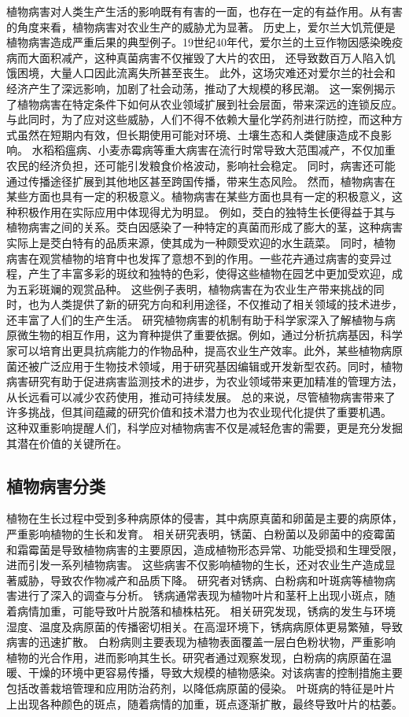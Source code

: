\documentclass[AutoFakeBold]{LZUThesis-PgD&PhD}
\begin{document}
植物病害对人类生产生活的影响既有有害的一面，也存在一定的有益作用。从有害的角度来看，植物病害对农业生产的威胁尤为显著。
历史上，爱尔兰大饥荒便是植物病害造成严重后果的典型例子。19世纪40年代，爱尔兰的土豆作物因感染晚疫病而大面积减产，这种真菌病害不仅摧毁了大片的农田，
还导致数百万人陷入饥饿困境，大量人口因此流离失所甚至丧生。
此外，这场灾难还对爱尔兰的社会和经济产生了深远影响，加剧了社会动荡，推动了大规模的移民潮。
这一案例揭示了植物病害在特定条件下如何从农业领域扩展到社会层面，带来深远的连锁反应。
与此同时，为了应对这些威胁，人们不得不依赖大量化学药剂进行防控，而这种方式虽然在短期内有效，但长期使用可能对环境、土壤生态和人类健康造成不良影响。
水稻稻瘟病、小麦赤霉病等重大病害在流行时常导致大范围减产，不仅加重农民的经济负担，还可能引发粮食价格波动，影响社会稳定。
同时，病害还可能通过传播途径扩展到其他地区甚至跨国传播，带来生态风险。
然而，植物病害在某些方面也具有一定的积极意义。植物病害在某些方面也具有一定的积极意义，这种积极作用在实际应用中体现得尤为明显。
例如，茭白的独特生长便得益于其与植物病害之间的关系。茭白因感染了一种特定的真菌而形成了膨大的茎，这种病害实际上是茭白特有的品质来源，使其成为一种颇受欢迎的水生蔬菜。
同时，植物病害在观赏植物的培育中也发挥了意想不到的作用。一些花卉通过病害的变异过程，产生了丰富多彩的斑纹和独特的色彩，使得这些植物在园艺中更加受欢迎，成为五彩斑斓的观赏品种。
这些例子表明，植物病害在为农业生产带来挑战的同时，也为人类提供了新的研究方向和利用途径，不仅推动了相关领域的技术进步，还丰富了人们的生产生活。
研究植物病害的机制有助于科学家深入了解植物与病原微生物的相互作用，这为育种提供了重要依据。例如，通过分析抗病基因，科学家可以培育出更具抗病能力的作物品种，提高农业生产效率。此外，某些植物病原菌还被广泛应用于生物技术领域，用于研究基因编辑或开发新型农药。同时，植物病害研究有助于促进病害监测技术的进步，为农业领域带来更加精准的管理方法，从长远看可以减少农药使用，推动可持续发展。
总的来说，尽管植物病害带来了许多挑战，但其间蕴藏的研究价值和技术潜力也为农业现代化提供了重要机遇。
这种双重影响提醒人们，科学应对植物病害不仅是减轻危害的需要，更是充分发掘其潜在价值的关键所在。



\subsection{植物病害分类}

植物在生长过程中受到多种病原体的侵害，其中病原真菌和卵菌是主要的病原体，严重影响植物的生长和发育。
相关研究表明，锈菌、白粉菌以及卵菌中的疫霉菌和霜霉菌是导致植物病害的主要原因，造成植物形态异常、功能受损和生理受限，进而引发一系列植物病害。
这些病害不仅影响植物的生长，还对农业生产造成显著威胁，导致农作物减产和品质下降。
研究者对锈病、白粉病和叶斑病等植物病害进行了深入的调查与分析。
锈病通常表现为植物叶片和茎秆上出现小斑点，随着病情加重，可能导致叶片脱落和植株枯死。
相关研究发现，锈病的发生与环境湿度、温度及病原菌的传播密切相关。在高湿环境下，锈病病原体更易繁殖，导致病害的迅速扩散。
白粉病则主要表现为植物表面覆盖一层白色粉状物，严重影响植物的光合作用，进而影响其生长。研究者通过观察发现，白粉病的病原菌在温暖、干燥的环境中更容易传播，导致大规模的植物感染。对该病害的控制措施主要包括改善栽培管理和应用防治药剂，以降低病原菌的侵染。
叶斑病的特征是叶片上出现各种颜色的斑点，随着病情的加重，斑点逐渐扩散，最终导致叶片的枯萎。
\end{document}
